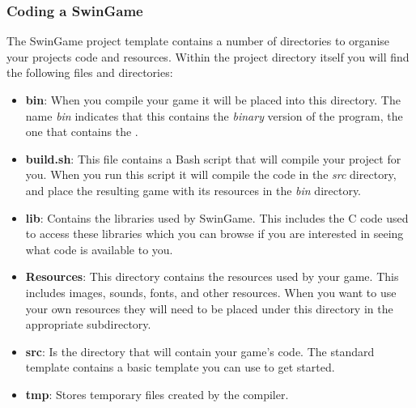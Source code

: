 
\clearpage
\subsubsection{Coding a SwinGame} %
\label{ssub:coding_a_swingame}

The SwinGame project template contains a number of directories to organise your projects code and resources. Within the project directory itself you will find the following files and directories:

\begin{itemize}
  \item \textbf{bin}: When you compile your game it will be placed into this directory. The name \emph{bin} indicates that this contains the \emph{binary} version of the program, the one that contains the .
  \item \textbf{build.sh}: This file contains a Bash script that will compile your project for you. When you run this script it will compile the code in the \emph{src} directory, and place the resulting game with its resources in the \emph{bin} directory.
  \item \textbf{lib}: Contains the libraries used by SwinGame. This includes the C code used to access these libraries which you can browse if you are interested in seeing what code is available to you.
  \item \textbf{Resources}: This directory contains the resources used by your game. This includes images, sounds, fonts, and other resources. When you want to use your own resources they will need to be placed under this directory in the appropriate subdirectory.
  \item \textbf{src}: Is the directory that will contain your game's code. The standard template contains a basic template you can use to get started.
  \item \textbf{tmp}: Stores temporary files created by the compiler. 
\end{itemize}

